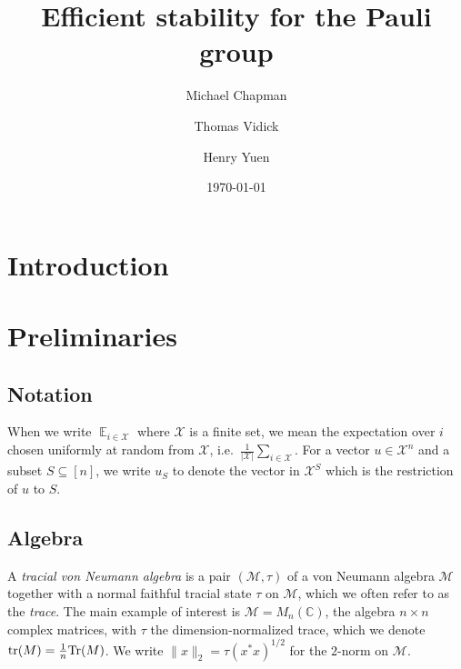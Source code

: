 \documentclass[11pt]{article}
\theoremstyle{definition}
\newcommand{\Tr}{\mbox{\rm Tr}}
\DeclareMathOperator*{\Expectation}{\mathbb{E}}
\newcommand{\Es}[1]{\Expectation_{#1}}
\newcommand{\C}{\ensuremath{\mathbb{C}}}
\newcommand{\mM}{\ensuremath{\mathcal{M}}}
\newcommand{\mX}{\ensuremath{\mathcal{X}}}
\DeclareMathOperator{\tr}{tr}
\begin{document}
\title{Efficient stability for the Pauli group}

\author[1]{Michael Chapman}
\author[2]{Thomas Vidick}
\author[3]{Henry Yuen}
\affil[1]{}
\affil[2]{}
\affil[3]{}

\date{\today}
\maketitle

\noteswarning


\begin{abstract}

\end{abstract}


\section{Introduction}



	\section{Preliminaries}

\subsection{Notation}

When we write $\Es{i\in \mX}$ where $\mX$ is a finite set, we mean the expectation over $i$ chosen uniformly at random from $\mX$, i.e.\ $\frac{1}{|\mX|} \sum_{i\in \mX}$. For a vector $u \in \mX^n$ and a subset $S \subseteq [n]$, we write $u_S$ to denote the vector in $\mX^S$ which is the restriction of $u$ to $S$.

\subsection{Algebra}

  A \emph{tracial von Neumann algebra} is a pair $(\mM,\tau)$ of a von Neumann algebra $\mM$ together with a normal faithful tracial state $\tau$ on $\mM$, which we often refer to as the \emph{trace}. The main example of interest is $\mM=M_n(\C)$, the algebra $n\times n$ complex matrices, with $\tau$ the dimension-normalized trace, which we denote $\tr(M)=\frac{1}{n}\Tr(M)$. 	We write $\|x\|_2=\tau(x^*x)^{1/2}$ for the $2$-norm on $\mM$. 
	
\end{document}
